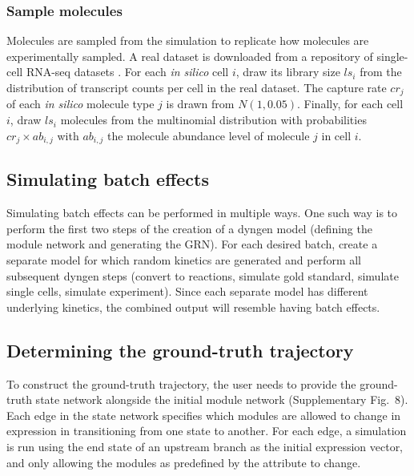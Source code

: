\documentclass[10pt, a4paper]{article}
\begin{document}
\subsubsection{Sample molecules}\label{sample-molecules}

Molecules are sampled from the simulation to replicate how molecules are
experimentally sampled. A real dataset is downloaded from a repository
of single-cell RNA-seq datasets
\cite{cannoodt_singlecellomicsdatasets_2018}. For each \emph{in
silico} cell \(i\), draw its library size \(ls_i\) from the distribution
of transcript counts per cell in the real dataset. The capture rate
\(cr_j\) of each \emph{in silico} molecule type \(j\) is drawn from
\(N(1, 0.05)\). Finally, for each cell \(i\), draw \(ls_i\) molecules
from the multinomial distribution with probabilities
\(cr_j \times ab_{i,j}\) with \(ab_{i,j}\) the molecule abundance level
of molecule \(j\) in cell \(i\).

\subsection{Simulating batch effects}\label{sec:dyngen-batcheffect}

Simulating batch effects can be performed in multiple ways. One such way
is to perform the first two steps of the creation of a dyngen model
(defining the module network and generating the GRN). For each desired
batch, create a separate model for which random kinetics are generated
and perform all subsequent dyngen steps (convert to reactions, simulate
gold standard, simulate single cells, simulate experiment). Since each
separate model has different underlying kinetics, the combined output
will resemble having batch effects.

\subsection{Determining the ground-truth trajectory}\label{sec:dyngen-groundtruth}

To construct the ground-truth trajectory, the user needs to provide the
ground-truth state network alongside the initial module network
(Supplementary Fig.~8). Each edge in the state network specifies which
modules are allowed to change in expression in transitioning from one
state to another. For each edge, a simulation is run using the end state
of an upstream branch as the initial expression vector, and only
allowing the modules as predefined by the attribute to change.
\end{document}
